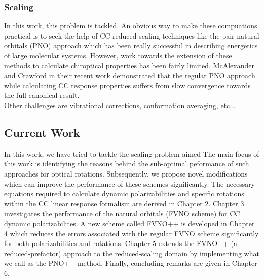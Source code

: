 \subsubsection{Scaling}
In this work, this problem is tackled.
An obvious way to make these compuations practical is to seek the help of CC reduced-scaling 
techniques like the pair natural orbitals (PNO) approach\cite{Neese09,NeeseCCSD09} which has been really successful in describing energetics of 
large molecular systems. However, work towards the extension of these methods to calculate chiroptical properties has been 
fairly limited\cite{Gauss00,Korona04,Russ04,McAlexander12,Friedrich15,Russ08}. McAlexander and Crawford in their recent 
work\cite{McAlexander15:LRCC} demonstrated that the regular PNO approach while calculating CC response properties 
suffers from slow convergence towards the full canonical result. \\
Other challenges are vibrational corrections, conformation averaging, etc...\\
\subsection{Current Work}
In this work, we have tried to tackle the scaling problem aimed
The main focus of this work is identifying the 
reasons behind the sub-optimal peformance of such approaches for optical rotations. Subsequently, we propose novel modifications
which can improve the performance of these schemes significantly. The necessary equations required to calculate dynamic polarizabilities and specific rotations within the CC linear response formalism are derived in Chapter 2. %
Chapter 3 investigates the performance of the natural orbitals (FVNO scheme) for CC dynamic polarizabilites.
A new scheme called FVNO++ is developed in Chapter 4 which reduces the errors associated with the regular FVNO scheme
significantly for both polarizabilities and rotations. Chapter 5 extends the FVNO++ (a reduced-prefactor) approach to the reduced-scaling 
domain by implementing what we call as the PNO++ method. Finally, concluding remarks are given in Chapter 6.
